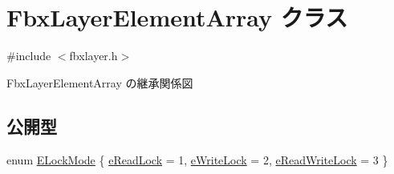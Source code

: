 \hypertarget{class_fbx_layer_element_array}{}\section{Fbx\+Layer\+Element\+Array クラス}
\label{class_fbx_layer_element_array}


{\ttfamily \#include $<$fbxlayer.\+h$>$}



Fbx\+Layer\+Element\+Array の継承関係図
\subsection*{公開型}
\begin{DoxyCompactItemize}
\item 
enum \hyperlink{class_fbx_layer_element_array_a8968b1fb337f924d0e9ca87302b54d70}{E\+Lock\+Mode} \{ \hyperlink{class_fbx_layer_element_array_a8968b1fb337f924d0e9ca87302b54d70a7b2eb94f6f2596621fb2aa043f271822}{e\+Read\+Lock} = 1, 
\hyperlink{class_fbx_layer_element_array_a8968b1fb337f924d0e9ca87302b54d70a461b83c6125c9965082658c1f67404e7}{e\+Write\+Lock} = 2, 
\hyperlink{class_fbx_layer_element_array_a8968b1fb337f924d0e9ca87302b54d70afb510a1a3f85e5a4294bd956f5f936f9}{e\+Read\+Write\+Lock} = 3
 \}
\end{DoxyCompactItemize}
